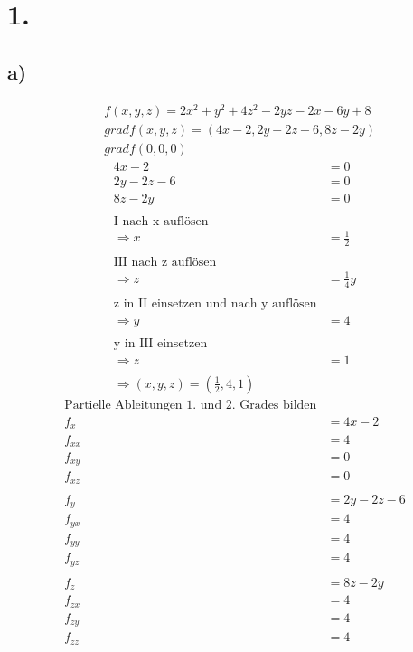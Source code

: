 \documentclass[a4paper]{scrartcl}
\title{\titleinfo}
\author{Elena Noll, Sven-Hendrik Haase, Arne Struck}
\date{\today}
\begin{document}
\maketitle
\notag
\section{1.}
\subsection{a)}
\begin{align}
&f(x,y,z) = 2x^2 + y^2 + 4z^2 - 2yz - 2x - 6y + 8 \\
&gradf(x,y,z) = (4x - 2, 2y - 2z - 6, 8z - 2y) \\
&gradf(0,0,0)
\end{align}
\begin{align}
4x - 2 &= 0 \\
2y - 2z - 6 &= 0 \\
8z - 2y &= 0 \\
\\
\text{I nach x auflösen} \\
\Rightarrow x &= \frac{1}{2} \\
\\
\text{III nach z auflösen} \\
\Rightarrow z &= \frac{1}{4}y \\
\\
\text{z in II einsetzen und nach y auflösen} \\
\Rightarrow y &= 4 \\
\\
\text{y in III einsetzen} \\
\Rightarrow z &= 1 \\
\\
\Rightarrow (x,y,z) = (\frac{1}{2},4,1)&
\end{align}
\begin{align}
\text{Partielle Ableitungen 1. und 2. Grades bilden} \\
f_x &= 4x - 2 \\
f_{xx} &= 4 \\
f_{xy} &= 0 \\
f_{xz} &= 0 \\
\\
f_y &= 2y - 2z - 6 \\
f_{yx} &= 4 \\
f_{yy} &= 4 \\
f_{yz} &= 4 \\
\\
f_z &= 8z - 2y \\
f_{zx} &= 4 \\
f_{zy} &= 4 \\
f_{zz} &= 4
\end{align}
\end{document}
